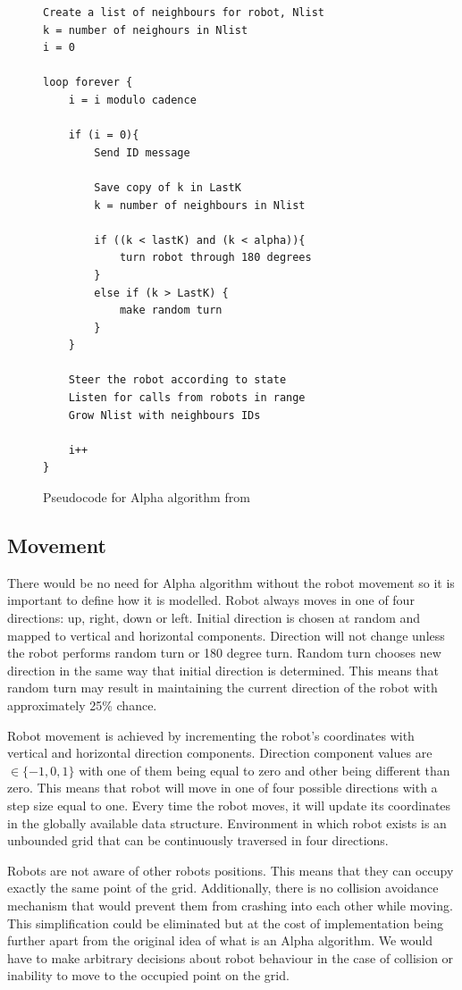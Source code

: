 \begin{figure}[H]
\caption{Pseudocode for Alpha algorithm from \cite{Minimalist_Coherent_Swarming_of_Wireless_Networked_Autonomous_Mobile_Robots}}
\begin{lstlisting}
Create a list of neighbours for robot, Nlist
k = number of neighours in Nlist
i = 0

loop forever {
	i = i modulo cadence

	if (i = 0){
		Send ID message

		Save copy of k in LastK
		k = number of neighbours in Nlist

		if ((k < lastK) and (k < alpha)){
			turn robot through 180 degrees
		}
		else if (k > LastK) {
			make random turn
		}
	}

	Steer the robot according to state
	Listen for calls from robots in range
	Grow Nlist with neighbours IDs

	i++
}
\end{lstlisting}
\label{fig:pseudocode}
\end{figure}


\subsection{Movement}
There would be no need for Alpha algorithm without the robot movement so it is important to define how it is modelled. Robot always moves in one of four directions: up, right, down or left. Initial direction is chosen at random and mapped to vertical and horizontal components. Direction will not change unless the robot performs random turn or 180 degree turn. Random turn chooses new direction in the same way that initial direction is determined. This means that random turn may result in maintaining the current direction of the robot with approximately 25\% chance. 

Robot movement is achieved by incrementing the robot's coordinates with vertical and horizontal direction components. Direction component values are  $\in \{-1, 0, 1\}$ with one of them being equal to zero and other being different than zero. This means that robot will move in one of four possible directions with a step size equal to one. Every time the robot moves, it will update its coordinates in the globally available data structure. Environment in which robot exists is an unbounded grid that can be continuously traversed in four directions.

Robots are not aware of other robots positions. This means that they can occupy exactly the same point of the grid. Additionally, there is no collision avoidance mechanism that would prevent them from crashing into each other while moving. This simplification could be eliminated but at the cost of implementation being further apart from the original idea of what is an Alpha algorithm. We would have to make arbitrary decisions about robot behaviour in the case of collision or inability to move to the occupied point on the grid.

